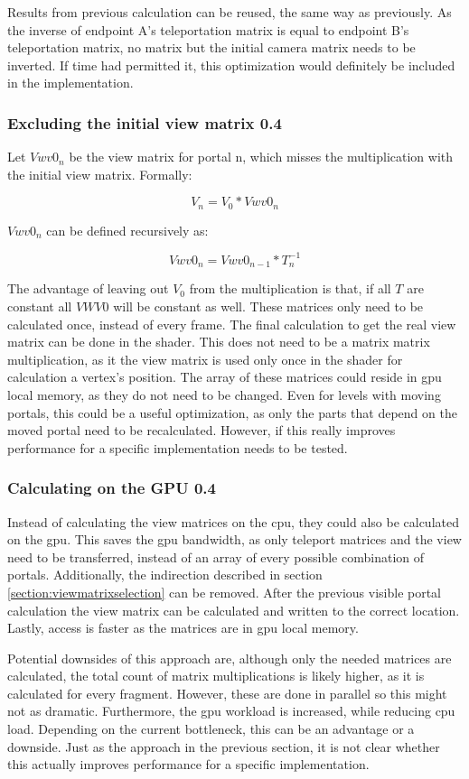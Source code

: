 Results from previous calculation can be reused, the same way as previously. As the inverse of \gls{endpoint} A's teleportation matrix is equal to \gls{endpoint} B's teleportation matrix, no matrix but the initial camera matrix needs to be inverted. If time had permitted it, this optimization would definitely be included in the implementation.

\subsubsection{Excluding the initial view matrix 0.4}
Let $Vwv0_n$ be the view matrix for portal n, which misses the multiplication with the initial view matrix. Formally:

$$V_n = V_0 * Vwv0_n$$

$Vwv0_n$ can be defined recursively as:

$$Vwv0_n = Vwv0_{n-1} * T_n^{-1}$$

The advantage of leaving out $V_0$ from the multiplication is that, if all $T$ are constant all $VWV0$ will be constant as well. These matrices only need to be calculated once, instead of every frame. The final calculation to get the real view matrix can be done in the shader. This does not need to be a matrix matrix multiplication, as it the view matrix is used only once in the shader for calculation a vertex's position. The array of these matrices could reside in \gls{gpu} local memory, as they do not need to be changed. Even for levels with moving portals, this could be a useful optimization, as only the parts that depend on the moved portal need to be recalculated. However, if this really improves performance for a specific implementation needs to be tested.

\subsubsection{Calculating on the GPU 0.4}
Instead of calculating the view matrices on the \gls{cpu}, they could also be calculated on the \gls{gpu}.
This saves the \gls{gpu} bandwidth, as only teleport matrices and the view need to be transferred, instead of an array of every possible combination of portals. Additionally, the indirection described in section \ref{section:viewmatrixselection} can be removed. After the previous visible portal calculation the view matrix can be calculated and written to the correct location. Lastly, access is faster as the matrices are in \gls{gpu} local memory.

Potential downsides of this approach are, although only the needed matrices are calculated, the total count of matrix multiplications is likely higher, as it is calculated for every fragment. However, these are done in parallel so this might not as dramatic. Furthermore, the \gls{gpu} workload is increased, while reducing \gls{cpu} load. Depending on the current bottleneck, this can be an advantage or a downside. Just as the approach in the previous section, it is not clear whether this actually improves performance for a specific implementation.

